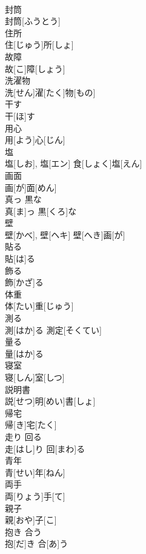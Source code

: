 \documentclass[8pt]{extreport}
\begin{document}
\begin{CJK}{UTF8}{min}
\\	封筒	
\\	封筒[ふうとう]	
\\	住所	
\\	住[じゅう]所[しょ]	
\\	故障	
\\	故[こ]障[しょう]	
\\	洗濯物	
\\	洗[せん]濯[たく]物[もの]	
\\	干す	
\\	干[ほ]す	
\\	用心	
\\	用[よう]心[じん]	
\\	塩	
\\	塩[しお], 塩[エン]	食[しょく]塩[えん] 
\\	画面	
\\	画[が]面[めん]	
\\	真っ 黒な	
\\	真[ま]っ 黒[くろ]な	
\\	壁	
\\	壁[かべ], 壁[ヘキ]	壁[へき]画[が] 
\\	貼る	
\\	貼[は]る	
\\	飾る	
\\	飾[かざ]る	
\\	体重	
\\	体[たい]重[じゅう]	
\\	測る	
\\	測[はか]る	測定[そくてい] 
\\	量る	
\\	量[はか]る	
\\	寝室	
\\	寝[しん]室[しつ]	
\\	説明書	
\\	説[せつ]明[めい]書[しょ]	
\\	帰宅	
\\	帰[き]宅[たく]	
\\	走り 回る	
\\	走[はし]り 回[まわ]る	
\\	青年	
\\	青[せい]年[ねん]	
\\	両手	
\\	両[りょう]手[て]	
\\	親子	
\\	親[おや]子[こ]	
\\	抱き 合う	
\\	抱[だ]き 合[あ]う	

\end{CJK}
\end{document}
